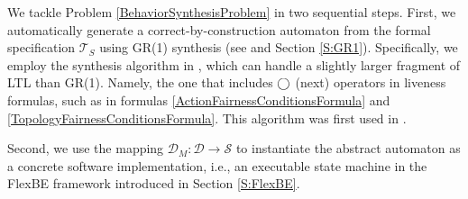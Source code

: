 
We tackle Problem \ref{BehaviorSynthesisProblem} in two sequential steps.
First, we automatically generate a correct-by-construction automaton from the formal specification $\mathcal{T}_S$ using GR(1) synthesis (see \cite{piterman_06} and Section \ref{S:GR1}).
Specifically, we employ the synthesis algorithm in \cite{SLUGS}, which can handle a slightly larger fragment of LTL than GR(1).
Namely, the one that includes $\operatorname{\bigcirc}$ (next) operators in liveness formulas, such as in formulas \eqref{ActionFairnessConditionsFormula} and \eqref{TopologyFairnessConditionsFormula}.
This algorithm was first used in \cite{Vasu2013ICRA}.

Second, we use the mapping $\mathcal{D}_M: \mathcal{D} \rightarrow \mathcal{S}$ to instantiate the abstract automaton as a concrete software implementation, i.e., an executable state machine in the FlexBE framework introduced in Section \ref{S:FlexBE}.

